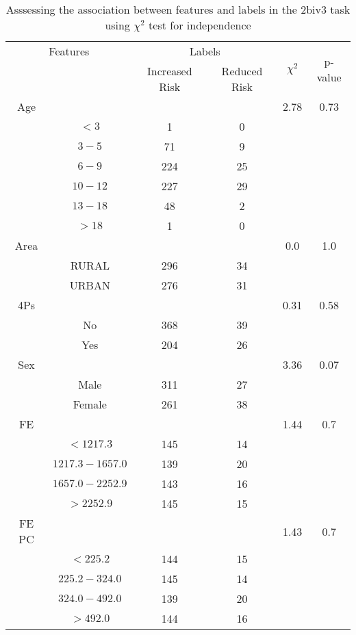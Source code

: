 \begin{table}[!htb]
\centering
\caption{Asssessing the association between features and labels in the 2biv3 task using $\chi^2$ test for independence}
\label{tab:chitest_2biv3}
\begin{tabular}{c c | c c| c | c}
\hline
\multicolumn{2}{c|}{Features}& \multicolumn{2}{c|}{Labels}& \multirow{2}{*}{$\chi^2$} & \multirow{2}{*}{p-value}\\ 
& & Increased Risk & Reduced Risk & & \\ 
\hline
Age &  &  & & 2.78 & 0.73 \\ 
& $< 3$ & 1 & 0& & \\ 
& $3-5$ & 71 & 9& & \\ 
& $6-9$ & 224 & 25& & \\ 
& $10-12$ & 227 & 29& & \\ 
& $13-18$ & 48 & 2& & \\ 
& $> 18$ & 1 & 0& & \\ 
\hline 
Area &  &  & & 0.0 & 1.0 \\ 
& RURAL & 296 & 34& & \\ 
& URBAN & 276 & 31& & \\ 
\hline 
4Ps &  &  & & 0.31 & 0.58 \\ 
& No & 368 & 39& & \\ 
& Yes & 204 & 26& & \\ 
\hline 
Sex &  &  & & 3.36 & 0.07 \\ 
& Male & 311 & 27& & \\ 
& Female & 261 & 38& & \\ 
\hline 
FE &  &  & & 1.44 & 0.7 \\ 
& $< 1217.3$ & 145 & 14& & \\ 
& $1217.3-1657.0$ & 139 & 20& & \\ 
& $1657.0-2252.9$ & 143 & 16& & \\ 
& $> 2252.9$ & 145 & 15& & \\ 
\hline 
FE PC &  &  & & 1.43 & 0.7 \\ 
& $< 225.2$ & 144 & 15& & \\ 
& $225.2-324.0$ & 145 & 14& & \\ 
& $324.0-492.0$ & 139 & 20& & \\ 
& $> 492.0$ & 144 & 16& & \\ 
\hline 
\end{tabular}
\end{table}
